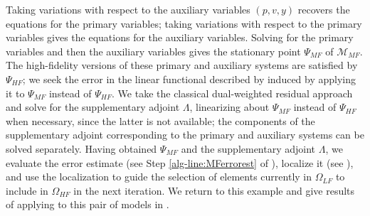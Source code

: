 \documentclass[review,sort&compress]{elsarticle}
\begin{document}
Taking variations with respect to the auxiliary variables $(p,v,y)$ recovers the equations for the primary variables; taking variations with respect to the primary variables gives the equations for the auxiliary variables. Solving for the primary variables and then the auxiliary variables gives the stationary point $\Psi_{MF}$ of $\mathcal{M}_{MF}$. 
The high-fidelity versions of these primary and auxiliary systems are satisfied by $\Psi_{HF}$; we seek the error in the linear functional described by  induced by applying it to $\Psi_{MF}$ instead of $\Psi_{HF}$. We take the classical dual-weighted residual approach and solve for the supplementary adjoint $\Lambda$, linearizing about $\Psi_{MF}$ instead of $\Psi_{HF}$ when necessary, since the latter is not available; the components of the supplementary adjoint corresponding to the primary and auxiliary systems can be solved separately. Having obtained $\Psi_{MF}$ and the supplementary adjoint $\Lambda$, we evaluate the error estimate (see Step \ref{alg-line:MFerrorest} of ), localize it (see ), and use the localization to guide the selection of elements currently in $\Omega_{LF}$ to include in $\Omega_{HF}$ in the next iteration. We return to this example and give results of applying  to this pair of models in .
\end{document}
